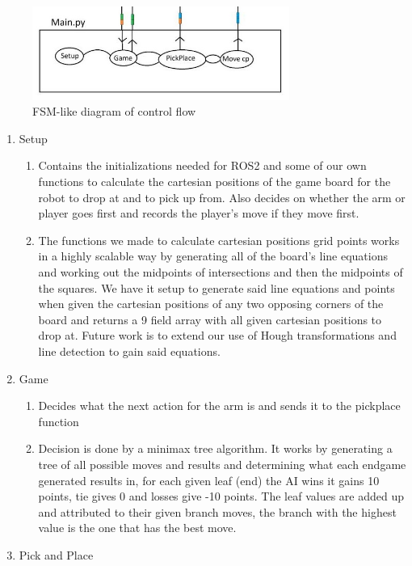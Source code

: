 \documentclass{article}
\begin{document}
\begin{figure}[h]
    \centering\includegraphics[width=0.75\textwidth]{game}
    \caption{FSM-like diagram of control flow}
\end{figure}

\begin{enumerate}

    \item Setup
        \begin{enumerate}
            \item Contains the initializations needed for ROS2 and some of our own functions to calculate the cartesian positions of the game board for the robot to drop at and to pick up from. Also decides on whether the arm or player goes first and records the player's move if they move first.
            \item The functions we made to calculate cartesian positions grid points works in a highly scalable way by generating all of the board’s line equations and working out the midpoints of intersections and then the midpoints of the squares. We have it setup to generate said line equations and points when given the cartesian positions of any two opposing corners of the board and returns a 9 field array with all given cartesian positions to drop at. Future work is to extend our use of Hough transformations and line detection to gain said equations.
        \end{enumerate}
    \item Game
        \begin{enumerate}
            \item Decides what the next action for the arm is and sends it to the pickplace function 
            \item Decision is done by a minimax tree algorithm. It works by generating a tree of all possible moves and results and determining what each endgame generated results in, for each given leaf (end) the AI wins it gains 10 points, tie gives 0 and losses give -10 points. The leaf values are added up and attributed to their given branch moves, the branch with the highest value is the one that has the best move.
        \end{enumerate}
    \item Pick and Place
        \begin{enumerate}
            

\end{enumerate}
\end{enumerate}
\end{document}
